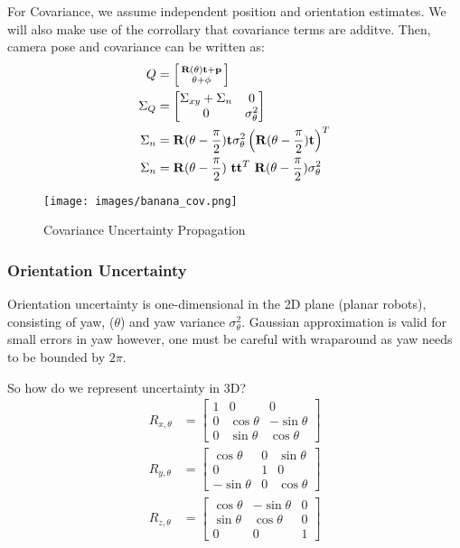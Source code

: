For Covariance, we assume independent position and orientation estimates. We will also make use of the corrollary that covariance terms are additve. Then, camera pose and covariance can be written as:
\begin{align*}
  Q &= \begin{bsmallmatrix} \mathbf{R}(\theta)\mathbf{t} + \mathbf{p} \\ \theta + \phi \end{bsmallmatrix} \\
  \Sigma_Q &= \begin{bmatrix} \Sigma_{xy} + \Sigma_{n} & 0 \\ 0 & \sigma_{\theta}^2 \end{bmatrix} \\
  \Sigma_n &= \mathbf{R}(\theta - \frac{\pi}{2})\mathbf{t}\sigma_{\theta}^2 \left( \mathbf{R}(\theta - \frac{\pi}{2})\mathbf{t}\right)^T\\
  \Sigma_n &= \mathbf{R}(\theta - \frac{\pi}{2}) \ \mathbf{t} \mathbf{t}^T \ \mathbf{R}(\theta - \frac{\pi}{2})\sigma_{\theta}^2\\
\end{align*}
\begin{figure}[H]
  \begin{center}
    \texttt{[image: images/banana\_cov.png]}
  \end{center}
  \caption{Covariance Uncertainty Propagation}\label{fig:}
\end{figure}

\subsubsection{Orientation Uncertainty}
Orientation uncertainty is one-dimensional in the 2D plane (planar robots), consisting of yaw, ($\theta$) and yaw variance $\sigma_{\theta}^2$.
Gaussian approximation is valid for small errors in yaw however, one must be careful with wraparound as yaw needs to be bounded by $2\pi$.

So how do we represent uncertainty in 3D?
\begin{align*}
R_{x,\theta} &= \begin{bmatrix}
1 & 0 & 0 \\
0 & \cos\theta & -\sin\theta \\
0 & \sin\theta & \cos\theta
\end{bmatrix} \\[1em]
R_{y,\theta} &= \begin{bmatrix}
\cos\theta & 0 & \sin\theta \\
0 & 1 & 0 \\
-\sin\theta & 0 & \cos\theta
\end{bmatrix} \\[1em]
R_{z,\theta} &= \begin{bmatrix}
\cos\theta & -\sin\theta & 0 \\
\sin\theta & \cos\theta & 0 \\
0 & 0 & 1
\end{bmatrix}
\end{align*}
